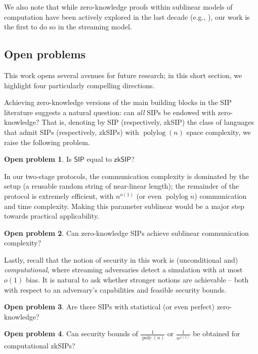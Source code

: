 \documentclass[a4paper,UKenglish,cleveref, autoref, thm-restate]{lipics-v2021}
\theoremstyle{definition}
\newtheorem{openproblem}{Open problem}
\newcommand{\zksip}{\textrm{zkSIP}}
\newcommand{\poly}{\operatorname{poly}}
\newcommand{\polylog}{\operatorname{polylog}}
\begin{document}
    We also note that while zero-knowledge proofs within sublinear models of computation have been actively explored in the last decade (e.g., \cite{BRV18, IW14}), our work is the first to do so in the streaming model.

\subsection{Open problems}

    This work opens several avenues for future research; in this short section, we highlight four particularly compelling directions.
    
    Achieving zero-knowledge versions of the main building blocks in the SIP literature suggests a natural question: can \emph{all} SIPs be endowed with zero-knowledge? That is, denoting by \textsf{SIP} (respectively, \textsf{zkSIP}) the class of languages that admit SIPs (respectively, \zksip{}s) with $\polylog(n)$ space complexity, we raise the following problem.
    \begin{openproblem}
        Is $\mathsf{SIP}$ equal to $\mathsf{zkSIP}$?
    \end{openproblem}

    In our two-stage protocols, the communication complexity is dominated by the setup (a reusable random string of near-linear length); the remainder of the protocol is extremely efficient, with $n^{o(1)}$ (or even $\polylog n$) communication and time complexity. Making this parameter sublinear would be a major step towards practical applicability.

    \begin{openproblem}
        Can zero-knowledge SIPs achieve sublinear communication complexity?
    \end{openproblem}
    
    Lastly, recall that the notion of security in this work is (unconditional and) \emph{computational}, where streaming adversaries detect a simulation with at most $o(1)$ bias. It is natural to ask whether stronger notions are achievable -- both with respect to an adversary's capabilities and feasible security bounds.
    
    \begin{openproblem}
        Are there SIPs with statistical (or even perfect) zero-knowledge?
    \end{openproblem}

    \begin{openproblem}
        Can security bounds of $\frac1{\poly(n)}$ or $\frac1{n^{\omega(1)}}$ be obtained for computational \zksip{}s?
    \end{openproblem}
    
\end{document}
